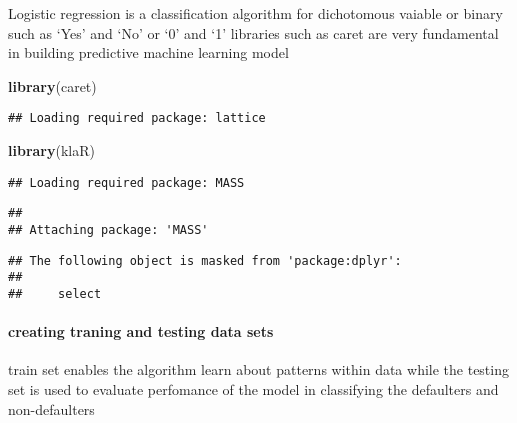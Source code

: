 \documentclass[]{article}
\newenvironment{Shaded}{\begin{snugshade}}{\end{snugshade}}
\newcommand{\DataTypeTok}[1]{\textcolor[rgb]{0.13,0.29,0.53}{#1}}
\newcommand{\FloatTok}[1]{\textcolor[rgb]{0.00,0.00,0.81}{#1}}
\newcommand{\KeywordTok}[1]{\textcolor[rgb]{0.13,0.29,0.53}{\textbf{#1}}}
\newcommand{\NormalTok}[1]{#1}
\newcommand{\OperatorTok}[1]{\textcolor[rgb]{0.81,0.36,0.00}{\textbf{#1}}}
\newcommand{\OtherTok}[1]{\textcolor[rgb]{0.56,0.35,0.01}{#1}}
\newcommand{\StringTok}[1]{\textcolor[rgb]{0.31,0.60,0.02}{#1}}
\let\oldparagraph\paragraph
\renewcommand{\paragraph}[1]{\oldparagraph{#1}\mbox{}}
\begin{document}
Logistic regression is a classification algorithm for dichotomous
vaiable or binary such as `Yes' and `No' or `0' and `1' libraries such
as caret are very fundamental in building predictive machine learning
model

\begin{Shaded}
\begin{Highlighting}[]
\KeywordTok{library}\NormalTok{(caret)}
\end{Highlighting}
\end{Shaded}

\begin{verbatim}
## Loading required package: lattice
\end{verbatim}

\begin{Shaded}
\begin{Highlighting}[]
\KeywordTok{library}\NormalTok{(klaR)}
\end{Highlighting}
\end{Shaded}

\begin{verbatim}
## Loading required package: MASS
\end{verbatim}

\begin{verbatim}
## 
## Attaching package: 'MASS'
\end{verbatim}

\begin{verbatim}
## The following object is masked from 'package:dplyr':
## 
##     select
\end{verbatim}

\hypertarget{creating-traning-and-testing-data-sets}{%
\paragraph{creating traning and testing data
sets}\label{creating-traning-and-testing-data-sets}}

train set enables the algorithm learn about patterns within data while
the testing set is used to evaluate perfomance of the model in
classifying the defaulters and non-defaulters

\begin{Shaded}
\end{Shaded}
\end{document}
